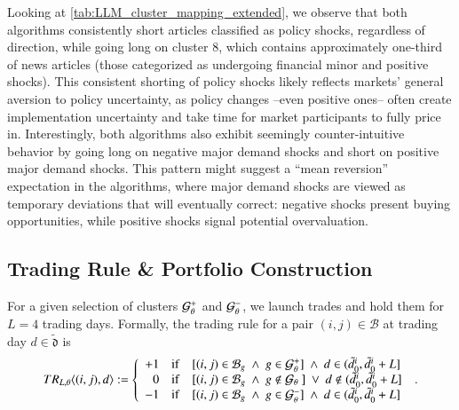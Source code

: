 Looking at \cref{tab:LLM_cluster_mapping_extended}, we observe that both algorithms consistently short articles classified as policy shocks, regardless of direction, while going long on cluster 8, which contains approximately one-third of news articles (those categorized as undergoing financial minor and positive shocks). This consistent shorting of policy shocks likely reflects markets' general aversion to policy uncertainty, as policy changes --even positive ones-- often create implementation uncertainty and take time for market participants to fully price in. Interestingly, both algorithms also exhibit seemingly counter-intuitive behavior by going long on negative major demand shocks and short on positive major demand shocks. This pattern might suggest a ``mean reversion'' expectation in the algorithms, where major demand shocks are viewed as temporary deviations that will eventually correct: negative shocks present buying opportunities, while positive shocks signal potential overvaluation.

\subsection{Trading Rule \& Portfolio Construction}
For a given selection of clusters $\G_{\theta}^+$ and $\G_{\theta}^-$, we launch trades and hold them for $L=4$ trading days.
%
Formally, the trading rule
 for a pair $(i,j)\in\mathcal{B}$ at trading day ${d}\in\tilde{\mathfrak d}$ is 
%
\begin{align*}
TR_{{{L}},\theta}\angl{(i,j),{d}} := \mycases{rllllll}{
+1
&\IF 
&
[
(i,j)\in\mathcal{B}_g
~\wedge~
g \in \G_{\theta}^+
]
~\wedge~
d \in (\tilde d_0^i, \tilde d_0^i + L]
\\
0
&\IF
&
[
(i,j)\in\mathcal{B}_g
~\wedge~
g \not\in \G_\theta ~
]
~\vee~
d \not\in (\tilde d_0^i, \tilde d_0^i + L]
\\
-1
&\IF 
&
[
(i,j)\in\mathcal{B}_g
~\wedge~
g \in \G_{\theta}^-
]
~\wedge~
d \in (\tilde d_0^i, \tilde d_0^i + L]
}
~.
\end{align*}

